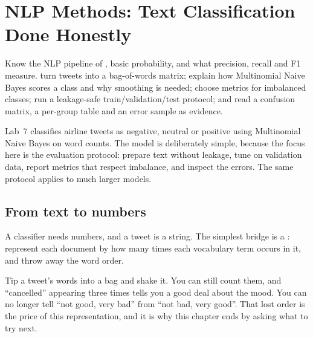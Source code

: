 \chapter{NLP Methods: Text Classification Done Honestly}
\label{ch:nlp-methods}

\chapterguide%
  {Know the NLP pipeline of , basic probability, and what precision, recall and F1 measure.}
  {turn tweets into a bag-of-words matrix; explain how Multinomial Naive Bayes scores a class and why smoothing is needed; choose metrics for imbalanced classes; run a leakage-safe train/validation/test protocol; and read a confusion matrix, a per-group table and an error sample as evidence.}

Lab~7 classifies airline tweets as negative, neutral or positive using Multinomial Naive Bayes on word counts. The model is deliberately simple, because the focus here is the evaluation protocol: prepare text without leakage, tune on validation data, report metrics that respect imbalance, and inspect the errors. The same protocol applies to much larger models.

\section{From text to numbers}

A classifier needs numbers, and a tweet is a string. The simplest bridge is a : represent each document by how many times each vocabulary term occurs in it, and throw away the word order.

\begin{analogy}
Tip a tweet's words into a bag and shake it. You can still count them, and ``cancelled'' appearing three times tells you a good deal about the mood. You can no longer tell ``not good, very bad'' from ``not bad, very good''. That lost order is the price of this representation, and it is why this chapter ends by asking what to try next.
\end{analogy}

